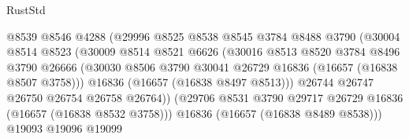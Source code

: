 \begin{lexlean}{RustStd}
\begin{coremodule}
                                      @8539
                                      @8546
                                      @4288
                                      (@29996
                                        @8525
                                        @8538
                                        @8545
                                        @3784
                                        @8488
                                        @3790
                                        (@30004
                                          @8514
                                          @8523
                                          (@30009
                                            @8514
                                            @8521
                                            @6626
                                            (@30016
                                              @8513
                                              @8520
                                              @3784
                                              @8496
                                              @3790
                                              @26666
                                              (@30030
                                                @8506
                                                @3790
                                                @30041
                                                @26729
                                                @16836
                                                (@16657 (@16838 @8507 @3758)))
                                              @16836
                                              (@16657 (@16838 @8497 @8513)))
                                            @26744
                                            @26747
                                            @26750
                                            @26754
                                            @26758
                                            @26764))
                                        (@29706
                                          @8531
                                          @3790
                                          @29717
                                          @26729
                                          @16836
                                          (@16657 (@16838 @8532 @3758)))
                                        @16836
                                        (@16657 (@16838 @8489 @8538)))
                                      @19093
                                      @19096
                                      @19099

\end{coremodule}
\end{lexlean}
